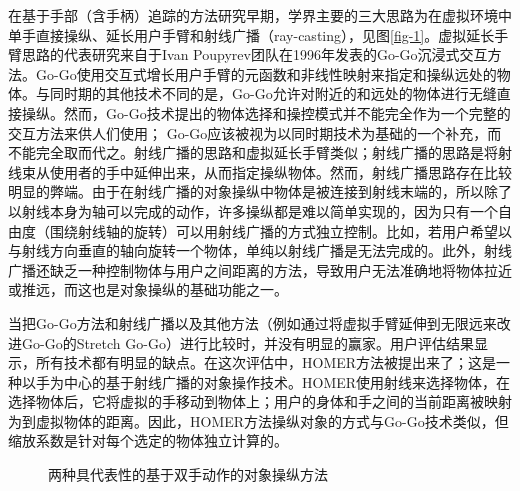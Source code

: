 在基于手部（含手柄）追踪的方法研究早期，学界主要的三大思路为在虚拟环境中单手直接操纵、延长用户手臂和射线广播（ray-casting），见图\ref{fig-1}。虚拟延长手臂思路的代表研究来自于Ivan Poupyrev团队在1996年发表的Go-Go沉浸式交互方法。Go-Go使用交互式增长用户手臂的元函数和非线性映射来指定和操纵远处的物体。与同时期的其他技术不同的是，Go-Go允许对附近的和远处的物体进行无缝直接操纵。然而，Go-Go技术提出的物体选择和操控模式并不能完全作为一个完整的交互方法来供人们使用； Go-Go应该被视为以同时期技术为基础的一个补充，而不能完全取而代之。射线广播的思路和虚拟延长手臂类似；射线广播的思路是将射线束从使用者的手中延伸出来，从而指定操纵物体。然而，射线广播思路存在比较明显的弊端。由于在射线广播的对象操纵中物体是被连接到射线末端的，所以除了以射线本身为轴可以完成的动作，许多操纵都是难以简单实现的，因为只有一个自由度（围绕射线轴的旋转）可以用射线广播的方式独立控制。比如，若用户希望以与射线方向垂直的轴向旋转一个物体，单纯以射线广播是无法完成的。此外，射线广播还缺乏一种控制物体与用户之间距离的方法，导致用户无法准确地将物体拉近或推远，而这也是对象操纵的基础功能之一。

当把Go-Go方法和射线广播以及其他方法（例如通过将虚拟手臂延伸到无限远来改进Go-Go的Stretch Go-Go）进行比较时，并没有明显的赢家。用户评估结果显示，所有技术都有明显的缺点。在这次评估中，HOMER方法被提出来了；这是一种以手为中心的基于射线广播的对象操作技术。HOMER使用射线来选择物体，在选择物体后，它将虚拟的手移动到物体上；用户的身体和手之间的当前距离被映射为到虚拟物体的距离。因此，HOMER方法操纵对象的方式与Go-Go技术类似，但缩放系数是针对每个选定的物体独立计算的。

\begin{figure}[t!]
    \centering
    \caption{两种具代表性的基于双手动作的对象操纵方法}
    \label{fig-2}
\end{figure}

